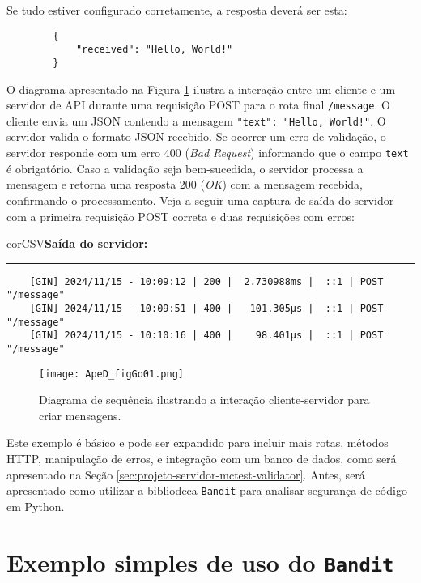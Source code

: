 Se tudo estiver configurado corretamente, a resposta deverá ser esta:

\begin{verbatim}
        {
            "received": "Hello, World!"
        }
\end{verbatim}

O diagrama apresentado na Figura \ref{fig:figGo01} ilustra a interação entre um cliente e um servidor de API durante uma requisição POST para o rota final \texttt{/message}. O cliente envia um JSON contendo a mensagem \texttt{"text": "Hello, World!"}. O servidor valida o formato JSON recebido. Se ocorrer um erro de validação, o servidor responde com um erro 400 (\textit{Bad Request}) informando que o campo \texttt{text} é obrigatório. Caso a validação seja bem-sucedida, o servidor processa a mensagem e retorna uma resposta 200 (\textit{OK}) com a mensagem recebida, confirmando o processamento. Veja a seguir uma captura de saída do servidor com a primeira requisição POST correta e duas requisições com erros:


\begin{myboxCode}{corCSV}{\textbf{Saída do servidor:}}\vspace{3mm}
    \hrule
    {\footnotesize
    \begin{verbatim}
    [GIN] 2024/11/15 - 10:09:12 | 200 |  2.730988ms |  ::1 | POST  "/message"
    [GIN] 2024/11/15 - 10:09:51 | 400 |   101.305µs |  ::1 | POST  "/message"
    [GIN] 2024/11/15 - 10:10:16 | 400 |    98.401µs |  ::1 | POST  "/message"
    \end{verbatim}
    }
    \end{myboxCode}
    

\begin{figure}[!ht]
    \centering
    \texttt{[image: ApeD\_figGo01.png]}
    \caption{Diagrama de sequência ilustrando a interação cliente-servidor para criar mensagens.}
    \label{fig:figGo01}
\end{figure}

Este exemplo é básico e pode ser expandido para incluir mais rotas, métodos HTTP, manipulação de erros, e integração com um banco de dados, como será apresentado na Seção \ref{sec:projeto-servidor-mctest-validator}. Antes, será apresentado como utilizar a bibliodeca \texttt{Bandit} para analisar segurança de código em Python.

\section{Exemplo simples de uso do \texttt{Bandit}}\label{sec:exemplo-bandit}

